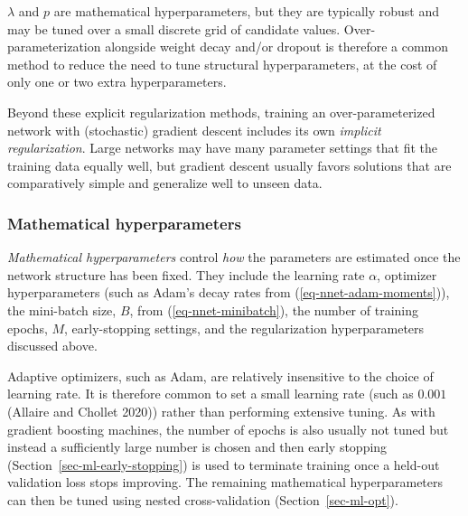 \documentclass[
  letterpaper,
  krantz2]{style/krantz}
\begin{document}
\(\lambda\) and \(p\) are mathematical hyperparameters, but they are
typically robust and may be tuned over a small discrete grid of
candidate
values.
Over-parameterization alongside weight decay and/or dropout is therefore
a common method to reduce the need to tune structural hyperparameters,
at the cost of only one or two extra hyperparameters.

Beyond these explicit regularization methods, training an
over-parameterized network with (stochastic) gradient descent includes
its own \emph{implicit regularization}. Large networks may have many
parameter settings that fit the training data equally well, but gradient
descent usually favors solutions that are comparatively simple and
generalize well to unseen data.

\subsubsection{Mathematical
hyperparameters}\label{mathematical-hyperparameters}

\emph{Mathematical hyperparameters} control \emph{how} the parameters
are estimated once the network structure has been
fixed. They include
the learning rate
\(\alpha\),
optimizer hyperparameters (such as Adam's decay rates from
(\ref{eq-nnet-adam-moments})),
the mini-batch size,
\(B\), from
(\ref{eq-nnet-minibatch}), the number of training
epochs, \(M\),
early-stopping settings, and the regularization hyperparameters
discussed above.

Adaptive optimizers, such as Adam, are relatively insensitive to the
choice of learning rate. It is therefore common to set a small learning
rate (such as \(0.001\) (Allaire and Chollet 2020)) rather than
performing extensive tuning. As
with gradient boosting machines, the number of epochs is also usually
not tuned but instead a sufficiently large number is chosen and then
early stopping (Section~\ref{sec-ml-early-stopping}) is used to
terminate training once a held-out validation loss stops
improving. The remaining mathematical
hyperparameters can then be tuned using nested cross-validation
(Section~\ref{sec-ml-opt}).
\end{document}
